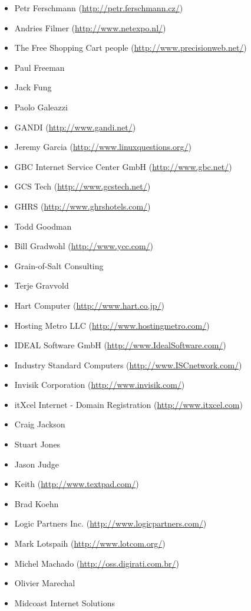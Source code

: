 \documentclass[a4paper,titlepage,12pt]{article}
\begin{document}
\begin{itemize}
	\item Petr Ferschmann (\url{http://petr.ferschmann.cz/})
	\item Andries Filmer (\url{http://www.netexpo.nl/})
	\item The Free Shopping Cart people (\url{http://www.precisionweb.net/})
	\item Paul Freeman
	\item Jack Fung
	\item Paolo Galeazzi
	\item GANDI (\url{http://www.gandi.net/})
	\item Jeremy Garcia (\url{http://www.linuxquestions.org/})
	\item GBC Internet Service Center GmbH (\url{http://www.gbc.net/})
	\item GCS Tech (\url{http://www.gcstech.net/})
	\item GHRS (\url{http://www.ghrshotels.com/})
	\item Todd Goodman
	\item Bill Gradwohl (\url{http://www.ycc.com/})
	\item Grain-of-Salt Consulting
	\item Terje Gravvold
	\item Hart Computer (\url{http://www.hart.co.jp/})
	\item Hosting Metro LLC (\url{http://www.hostingmetro.com/})
	\item IDEAL Software GmbH (\url{http://www.IdealSoftware.com/})
	\item Industry Standard Computers (\url{http://www.ISCnetwork.com/})
	\item Invisik Corporation (\url{http://www.invisik.com/})
	\item itXcel Internet - Domain Registration (\url{http://www.itxcel.com})
	\item Craig Jackson
	\item Stuart Jones
	\item Jason Judge
	\item Keith (\url{http://www.textpad.com/})
	\item Brad Koehn
	\item Logic Partners Inc. (\url{http://www.logicpartners.com/})
	\item Mark Lotspaih (\url{http://www.lotcom.org/})
	\item Michel Machado (\url{http://oss.digirati.com.br/})
	\item Olivier Marechal
	\item Midcoast Internet Solutions

\end{itemize}
\end{document}
